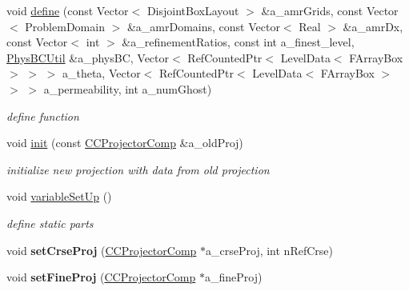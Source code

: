 \begin{DoxyCompactItemize}
\item 
\hypertarget{class_c_c_projector_comp_addc5db59d2d9007f95e89e87d9701ee3}{void \hyperlink{class_c_c_projector_comp_addc5db59d2d9007f95e89e87d9701ee3}{define} (const Vector$<$ Disjoint\-Box\-Layout $>$ \&a\-\_\-amr\-Grids, const Vector$<$ Problem\-Domain $>$ \&a\-\_\-amr\-Domains, const Vector$<$ Real $>$ \&a\-\_\-amr\-Dx, const Vector$<$ int $>$ \&a\-\_\-refinement\-Ratios, const int a\-\_\-finest\-\_\-level, \hyperlink{class_phys_b_c_util}{Phys\-B\-C\-Util} \&a\-\_\-phys\-B\-C, Vector$<$ Ref\-Counted\-Ptr$<$ Level\-Data$<$ F\-Array\-Box $>$ $>$ $>$ a\-\_\-theta, Vector$<$ Ref\-Counted\-Ptr$<$ Level\-Data$<$ F\-Array\-Box $>$ $>$ $>$ a\-\_\-permeability, int a\-\_\-num\-Ghost)}\label{class_c_c_projector_comp_addc5db59d2d9007f95e89e87d9701ee3}

\begin{DoxyCompactList}\small\item\em define function \end{DoxyCompactList}\item 
\hypertarget{class_c_c_projector_comp_a34287a85dbda53baf0f7e07a36a131ae}{void \hyperlink{class_c_c_projector_comp_a34287a85dbda53baf0f7e07a36a131ae}{init} (const \hyperlink{class_c_c_projector_comp}{C\-C\-Projector\-Comp} \&a\-\_\-old\-Proj)}\label{class_c_c_projector_comp_a34287a85dbda53baf0f7e07a36a131ae}

\begin{DoxyCompactList}\small\item\em initialize new projection with data from old projection \end{DoxyCompactList}\item 
\hypertarget{class_c_c_projector_comp_a7ef6f27d21505df4f64d57770d98bbac}{void \hyperlink{class_c_c_projector_comp_a7ef6f27d21505df4f64d57770d98bbac}{variable\-Set\-Up} ()}\label{class_c_c_projector_comp_a7ef6f27d21505df4f64d57770d98bbac}

\begin{DoxyCompactList}\small\item\em define static parts \end{DoxyCompactList}\item 
\hypertarget{class_c_c_projector_comp_a330443b56fc297cba877d6a2350655d5}{void {\bfseries set\-Crse\-Proj} (\hyperlink{class_c_c_projector_comp}{C\-C\-Projector\-Comp} $\ast$a\-\_\-crse\-Proj, int n\-Ref\-Crse)}\label{class_c_c_projector_comp_a330443b56fc297cba877d6a2350655d5}

\item 
\hypertarget{class_c_c_projector_comp_a59d85b9472aa021c274ebfceb36bf747}{void {\bfseries set\-Fine\-Proj} (\hyperlink{class_c_c_projector_comp}{C\-C\-Projector\-Comp} $\ast$a\-\_\-fine\-Proj)}\label{class_c_c_projector_comp_a59d85b9472aa021c274ebfceb36bf747}


\end{DoxyCompactItemize}
